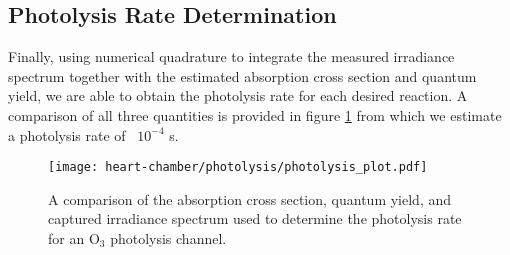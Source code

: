 \subsection{Photolysis Rate Determination}

Finally, using numerical quadrature to integrate the measured irradiance spectrum together with the estimated absorption cross section and quantum yield, we are able to obtain the photolysis rate for each desired reaction. A comparison of all three quantities is provided in figure \ref{fig:photo-rate-example} from which we estimate a photolysis rate of ~$10^{-4}$ s.
\begin{figure}[!hbt]
  \centering
  \texttt{[image: heart-chamber/photolysis/photolysis\_plot.pdf]}
  \caption{A comparison of the absorption cross section, quantum yield, and captured irradiance spectrum used to determine the photolysis rate for an $\mathrm{O_3}$ photolysis channel.}
  \label{fig:photo-rate-example}
\end{figure}










